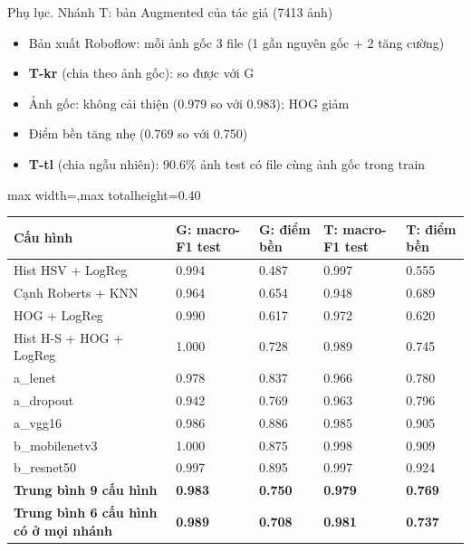 \documentclass[aspectratio=169,10pt]{beamer}
\begin{document}
\begin{frame}{Phụ lục. Nhánh T: bản Augmented của tác giả (7413 ảnh)}
\begin{itemize}\footnotesize
\item Bản xuất Roboflow: mỗi ảnh gốc 3 file (1 gần nguyên gốc + 2 tăng cường)
\item \textbf{T-kr} (chia theo ảnh gốc): so được với G
\item Ảnh gốc: không cải thiện (0.979 so với 0.983); HOG giảm
\item Điểm bền tăng nhẹ (0.769 so với 0.750)
\item \textbf{T-tl} (chia ngẫu nhiên): 90.6\% ảnh test có file cùng ảnh gốc trong train
\end{itemize}
\begin{center}\begin{adjustbox}{max width=\linewidth,max totalheight=0.40\textheight}
\begin{tabular}{lllll}\toprule
\textbf{Cấu hình} & \textbf{G: macro-F1 test} & \textbf{G: điểm bền} & \textbf{T: macro-F1 test} & \textbf{T: điểm bền} \\ \midrule
Hist HSV + LogReg & 0.994 & 0.487 & 0.997 & 0.555 \\
Cạnh Roberts + KNN & 0.964 & 0.654 & 0.948 & 0.689 \\
HOG + LogReg & 0.990 & 0.617 & 0.972 & 0.620 \\
Hist H-S + HOG + LogReg & 1.000 & 0.728 & 0.989 & 0.745 \\
a\_lenet & 0.978 & 0.837 & 0.966 & 0.780 \\
a\_dropout & 0.942 & 0.769 & 0.963 & 0.796 \\
a\_vgg16 & 0.986 & 0.886 & 0.985 & 0.905 \\
b\_mobilenetv3 & 1.000 & 0.875 & 0.998 & 0.909 \\
b\_resnet50 & 0.997 & 0.895 & 0.997 & 0.924 \\
\textbf{Trung bình 9 cấu hình} & \textbf{0.983} & \textbf{0.750} & \textbf{0.979} & \textbf{0.769} \\
\textbf{Trung bình 6 cấu hình có ở mọi nhánh} & \textbf{0.989} & \textbf{0.708} & \textbf{0.981} & \textbf{0.737} \\
\bottomrule\end{tabular}
\end{adjustbox}\end{center}
\end{frame}
\end{document}
